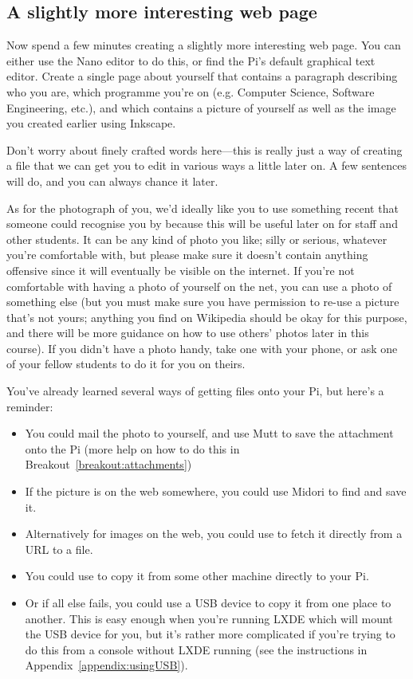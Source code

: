 \subsection{A slightly more interesting web page}

Now spend a few minutes creating a slightly more interesting web page. You can either use the Nano editor to do this, or find the Pi's default graphical text editor. Create a single page about yourself that contains a paragraph describing who you are, which programme you're on (e.g. Computer Science, Software Engineering, etc.), and which contains a picture of yourself as well as the image you created earlier using Inkscape. 

Don't worry about finely crafted words here---this is really just a way of creating a file that we can get you to edit in various ways a little later on. A few sentences will do, and you can always chance it later. 

As for the photograph of you, we'd ideally like you to use something recent that someone could recognise you by because this will be useful later on for staff and other students. It can be any kind of photo you like; silly or serious, whatever you're comfortable with, but please make sure it doesn't contain anything offensive since it will eventually be visible on the internet. If you're not comfortable with having a photo of yourself on the net, you can use a photo of something else (but you must make sure you have permission to re-use a picture that's not yours; anything you find on Wikipedia should be okay for this purpose, and there will be more guidance on how to use others' photos later in this course). If you didn't have a photo handy, take one with your phone, or ask one of your fellow students to do it for you on theirs.

You've already learned several ways of getting files onto your Pi, but here's a reminder:
\begin{itemize}
\item You could mail the photo to yourself, and use Mutt to save the attachment onto the Pi (more help on how to do this in Breakout~\ref{breakout:attachments})
\item If the picture is on the web somewhere, you could use Midori to find and save it. 
\item Alternatively for images on the web, you could use  to fetch it directly from a URL to a file. 
\item You could use  to copy it from some other machine directly to your Pi. 
\item Or if all else fails, you could use a USB device to copy it from one place to another. This is easy enough when you're running LXDE which will mount the USB device for you, but it's rather more complicated if you're trying to do this from a console without LXDE running (see the instructions in Appendix~\ref{appendix:usingUSB}).
\end{itemize}

